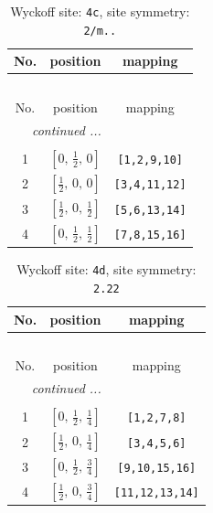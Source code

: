 \documentclass[fleqn,8pt]{jsarticle}
\begin{document}
\renewcommand{\arraystretch}{1.2}
\begin{longtable}{ccc}
\caption{Wyckoff site: {\tt 4c}, site symmetry: {\tt 2/m..}}
 \\
 \hline \hline
No. & position & mapping \\ \hline \endfirsthead

\multicolumn{2}{l}{\tablename\ \thetable{}} \\
 \hline \hline
No. & position & mapping \\ \hline \endhead

 \hline \hline
\multicolumn{2}{r}{\footnotesize\it continued ...} \\ \endfoot

 \hline \hline
\multicolumn{2}{r}{} \\ \endlastfoot

1 & $\left[ 0,\, \frac{1}{2},\, 0 \right]$ & {\tt [1,2,9,10]} \\ \hline
2 & $\left[ \frac{1}{2},\, 0,\, 0 \right]$ & {\tt [3,4,11,12]} \\ \hline
3 & $\left[ \frac{1}{2},\, 0,\, \frac{1}{2} \right]$ & {\tt [5,6,13,14]} \\ \hline
4 & $\left[ 0,\, \frac{1}{2},\, \frac{1}{2} \right]$ & {\tt [7,8,15,16]} \\
\end{longtable}
\renewcommand{\arraystretch}{1.2}
\begin{longtable}{ccc}
\caption{Wyckoff site: {\tt 4d}, site symmetry: {\tt 2.22}}
 \\
 \hline \hline
No. & position & mapping \\ \hline \endfirsthead

\multicolumn{2}{l}{\tablename\ \thetable{}} \\
 \hline \hline
No. & position & mapping \\ \hline \endhead

 \hline \hline
\multicolumn{2}{r}{\footnotesize\it continued ...} \\ \endfoot

 \hline \hline
\multicolumn{2}{r}{} \\ \endlastfoot

1 & $\left[ 0,\, \frac{1}{2},\, \frac{1}{4} \right]$ & {\tt [1,2,7,8]} \\ \hline
2 & $\left[ \frac{1}{2},\, 0,\, \frac{1}{4} \right]$ & {\tt [3,4,5,6]} \\ \hline
3 & $\left[ 0,\, \frac{1}{2},\, \frac{3}{4} \right]$ & {\tt [9,10,15,16]} \\ \hline
4 & $\left[ \frac{1}{2},\, 0,\, \frac{3}{4} \right]$ & {\tt [11,12,13,14]} \\
\end{longtable}
\end{document}
